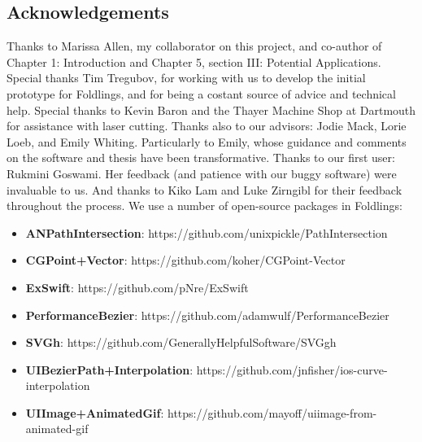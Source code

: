 \pagestyle{plain}
\begin{center}


\section*{Acknowledgements}
\singlespacing
Thanks to Marissa Allen, my collaborator on this project, and co-author of Chapter 1: Introduction and Chapter 5, section III: Potential Applications. \newline \newline
Special thanks Tim Tregubov, for working with us to develop the initial prototype for Foldlings, and for being a costant source of advice and technical help. \newline \newline
Special thanks to Kevin Baron and the Thayer Machine Shop at Dartmouth for assistance with laser cutting. \newline \newline
Thanks also to our advisors: Jodie Mack, Lorie Loeb, and Emily Whiting.  Particularly to Emily, whose guidance and comments on the software and thesis have been transformative. \newline \newline
Thanks to our first user: Rukmini Goswami.  Her feedback (and patience with our buggy software) were invaluable to us. \newline \newline
And thanks to Kiko Lam and Luke Zirngibl for their feedback throughout the process. \newline \newline \newline
We use a number of open-source packages in Foldlings:

\begin{itemize}
  \item \textbf{ANPathIntersection}: https://github.com/unixpickle/PathIntersection
  \item \textbf{CGPoint+Vector}: https://github.com/koher/CGPoint-Vector
  \item \textbf{ExSwift}: https://github.com/pNre/ExSwift
  \item \textbf{PerformanceBezier}: https://github.com/adamwulf/PerformanceBezier
  \item \textbf{SVGh}: https://github.com/GenerallyHelpfulSoftware/SVGgh
  \item \textbf{UIBezierPath+Interpolation}: https://github.com/jnfisher/ios-curve-interpolation
  \item \textbf{UIImage+AnimatedGif}: https://github.com/mayoff/uiimage-from-animated-gif
\end{itemize}


\end{center}

\doublespacing
\cleardoublepage
